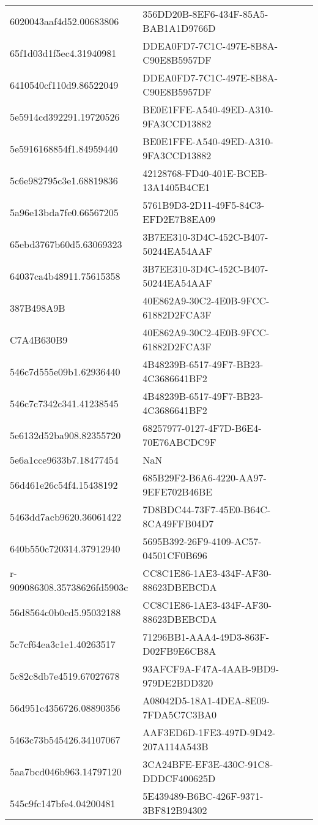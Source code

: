\begin{tabular}{ll}
6020043aaf4d52.00683806 & 356DD20B-8EF6-434F-85A5-BAB1A1D9766D \\
65f1d03d1f5ec4.31940981 & DDEA0FD7-7C1C-497E-8B8A-C90E8B5957DF \\
6410540cf110d9.86522049 & DDEA0FD7-7C1C-497E-8B8A-C90E8B5957DF \\
5e5914cd392291.19720526 & BE0E1FFE-A540-49ED-A310-9FA3CCD13882 \\
5e5916168854f1.84959440 & BE0E1FFE-A540-49ED-A310-9FA3CCD13882 \\
5c6e982795c3e1.68819836 & 42128768-FD40-401E-BCEB-13A1405B4CE1 \\
5a96e13bda7fe0.66567205 & 5761B9D3-2D11-49F5-84C3-EFD2E7B8EA09 \\
65ebd3767b60d5.63069323 & 3B7EE310-3D4C-452C-B407-50244EA54AAF \\
64037ca4b48911.75615358 & 3B7EE310-3D4C-452C-B407-50244EA54AAF \\
387B498A9B & 40E862A9-30C2-4E0B-9FCC-61882D2FCA3F \\
C7A4B630B9 & 40E862A9-30C2-4E0B-9FCC-61882D2FCA3F \\
546c7d555e09b1.62936440 & 4B48239B-6517-49F7-BB23-4C3686641BF2 \\
546c7c7342c341.41238545 & 4B48239B-6517-49F7-BB23-4C3686641BF2 \\
5e6132d52ba908.82355720 & 68257977-0127-4F7D-B6E4-70E76ABCDC9F \\
5e6a1cce9633b7.18477454 & NaN \\
56d461e26c54f4.15438192 & 685B29F2-B6A6-4220-AA97-9EFE702B46BE \\
5463dd7acb9620.36061422 & 7D8BDC44-73F7-45E0-B64C-8CA49FFB04D7 \\
640b550c720314.37912940 & 5695B392-26F9-4109-AC57-04501CF0B696 \\
r-909086308.35738626fd5903c & CC8C1E86-1AE3-434F-AF30-88623DBEBCDA \\
56d8564c0b0cd5.95032188 & CC8C1E86-1AE3-434F-AF30-88623DBEBCDA \\
5c7cf64ea3c1e1.40263517 & 71296BB1-AAA4-49D3-863F-D02FB9E6CB8A \\
5c82c8db7e4519.67027678 & 93AFCF9A-F47A-4AAB-9BD9-979DE2BDD320 \\
56d951c4356726.08890356 & A08042D5-18A1-4DEA-8E09-7FDA5C7C3BA0 \\
5463c73b545426.34107067 & AAF3ED6D-1FE3-497D-9D42-207A114A543B \\
5aa7bcd046b963.14797120 & 3CA24BFE-EF3E-430C-91C8-DDDCF400625D \\
545c9fc147bfe4.04200481 & 5E439489-B6BC-426F-9371-3BF812B94302 \\

\end{tabular}
